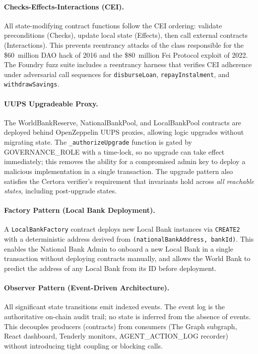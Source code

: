 \paragraph{Checks-Effects-Interactions (CEI).}
All state-modifying contract functions follow the CEI ordering: validate
preconditions (Checks), update local state (Effects), then call external
contracts (Interactions). This prevents reentrancy attacks of the class
responsible for the \$60~million DAO hack of 2016 and the \$80~million
Fei Protocol exploit of 2022. The Foundry fuzz suite includes a reentrancy
harness that verifies CEI adherence under adversarial call sequences for
\texttt{disburseLoan}, \texttt{repayInstalment}, and
\texttt{withdrawSavings}.

\paragraph{UUPS Upgradeable Proxy.}
The WorldBankReserve, NationalBankPool, and LocalBankPool contracts are
deployed behind OpenZeppelin UUPS proxies, allowing logic upgrades without
migrating state. The \texttt{\_authorizeUpgrade} function is gated by
GOVERNANCE\_ROLE with a time-lock, so no upgrade can take effect
immediately; this removes the ability for a compromised admin key to deploy
a malicious implementation in a single transaction. The upgrade pattern
also satisfies the Certora verifier's requirement that invariants hold
across \emph{all reachable states}, including post-upgrade states.

\paragraph{Factory Pattern (Local Bank Deployment).}
A \texttt{LocalBankFactory} contract deploys new Local Bank instances via
\texttt{CREATE2} with a deterministic address derived from
\texttt{(nationalBankAddress, bankId)}. This enables the National Bank
Admin to onboard a new Local Bank in a single transaction without
deploying contracts manually, and allows the World Bank to predict the
address of any Local Bank from its ID before deployment.

\paragraph{Observer Pattern (Event-Driven Architecture).}
All significant state transitions emit indexed events. The event log is the
authoritative on-chain audit trail; no state is inferred from the absence
of events. This decouples producers (contracts) from consumers (The Graph
subgraph, React dashboard, Tenderly monitors, AGENT\_ACTION\_LOG recorder)
without introducing tight coupling or blocking calls.

